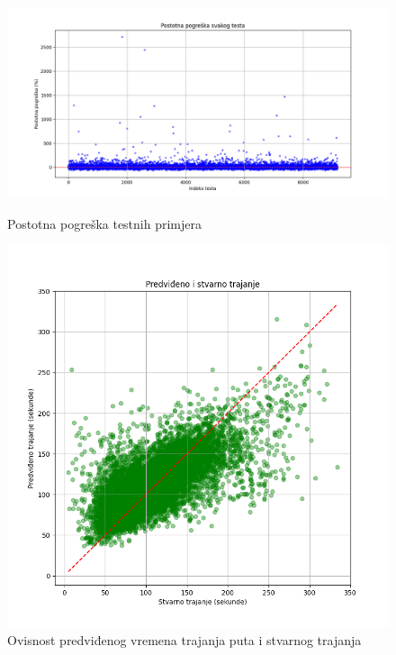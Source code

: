\documentclass[seminarskirad]{fer}
\begin{document}
\begin{figure}[h!]
	\centering
	\begin{minipage}{0.48\textwidth}
		\centering
		\includegraphics[width=\textwidth]{Figures/postotna_pogreska.png}
		\caption{Postotna pogreška testnih primjera}
		\label{fig:postotna_pogreska}
	\end{minipage}
	\hfill
	\begin{minipage}{0.48\textwidth}
		\centering
		\includegraphics[width=\textwidth]{Figures/predvideno_stvarno.png}
		\caption{Ovisnost predviđenog vremena trajanja puta i stvarnog trajanja}
		\label{fig:predvideno_stvarno}
	\end{minipage}
\end{figure}
\end{document}
